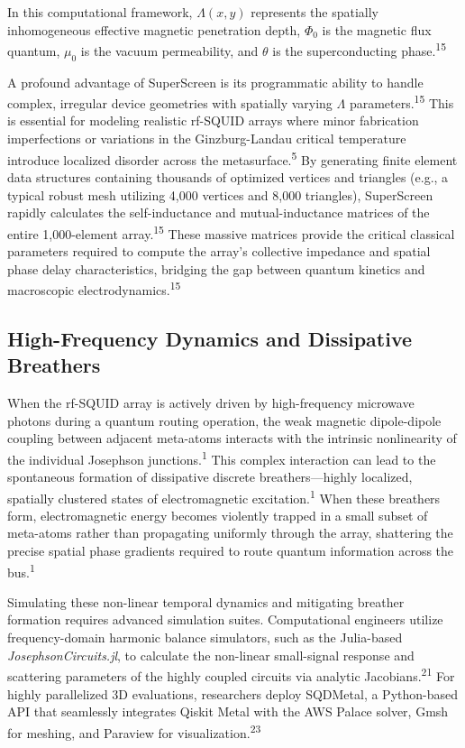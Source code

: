 \documentclass[11pt, a4paper]{article}
\begin{document}
In this computational framework, $\Lambda(x,y)$ represents the spatially inhomogeneous effective magnetic penetration depth, $\Phi_0$ is the magnetic flux quantum, $\mu_0$ is the vacuum permeability, and $\theta$ is the superconducting phase.\textsuperscript{15}

A profound advantage of SuperScreen is its programmatic ability to handle complex, irregular device geometries with spatially varying $\Lambda$ parameters.\textsuperscript{15} This is essential for modeling realistic rf-SQUID arrays where minor fabrication imperfections or variations in the Ginzburg-Landau critical temperature introduce localized disorder across the metasurface.\textsuperscript{5} By generating finite element data structures containing thousands of optimized vertices and triangles (e.g., a typical robust mesh utilizing 4,000 vertices and 8,000 triangles), SuperScreen rapidly calculates the self-inductance and mutual-inductance matrices of the entire 1,000-element array.\textsuperscript{15} These massive matrices provide the critical classical parameters required to compute the array's collective impedance and spatial phase delay characteristics, bridging the gap between quantum kinetics and macroscopic electrodynamics.\textsuperscript{15}

\subsection{High-Frequency Dynamics and Dissipative Breathers}

When the rf-SQUID array is actively driven by high-frequency microwave photons during a quantum routing operation, the weak magnetic dipole-dipole coupling between adjacent meta-atoms interacts with the intrinsic nonlinearity of the individual Josephson junctions.\textsuperscript{1} This complex interaction can lead to the spontaneous formation of dissipative discrete breathers---highly localized, spatially clustered states of electromagnetic excitation.\textsuperscript{1} When these breathers form, electromagnetic energy becomes violently trapped in a small subset of meta-atoms rather than propagating uniformly through the array, shattering the precise spatial phase gradients required to route quantum information across the bus.\textsuperscript{1}

Simulating these non-linear temporal dynamics and mitigating breather formation requires advanced simulation suites. Computational engineers utilize frequency-domain harmonic balance simulators, such as the Julia-based \textit{JosephsonCircuits.jl}, to calculate the non-linear small-signal response and scattering parameters of the highly coupled circuits via analytic Jacobians.\textsuperscript{21} For highly parallelized 3D evaluations, researchers deploy SQDMetal, a Python-based API that seamlessly integrates Qiskit Metal with the AWS Palace solver, Gmsh for meshing, and Paraview for visualization.\textsuperscript{23}
\end{document}
